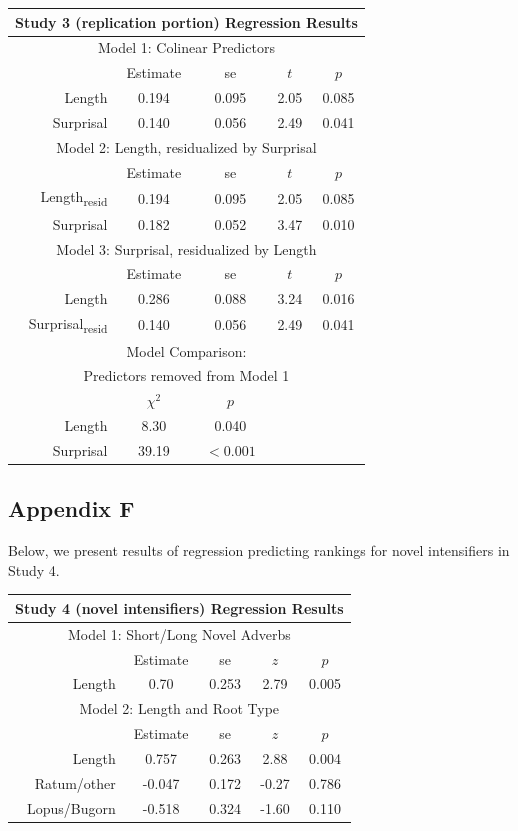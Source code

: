\noindent
\footnotesize{
\begin{tabular}{r|cccc}
\hline
\hline
\multicolumn{5}{c}{\textbf{Study 3 (replication portion) Regression Results}} \\
\hline
\hline
\multicolumn{5}{c}{Model 1: Colinear Predictors} \\
& Estimate & se & $t$ & $p$ \\
\hline
Length & 0.194 & 0.095 & 2.05 & 0.085 \\
Surprisal & 0.140 & 0.056 & 2.49 & 0.041 \\
\hline
\hline
\multicolumn{5}{c}{Model 2: Length, residualized by Surprisal} \\
& Estimate & se & $t$ & $p$ \\
\hline
Length\textsubscript{resid} & 0.194 & 0.095 & 2.05 & 0.085 \\
Surprisal & 0.182 & 0.052 & 3.47 & 0.010 \\
\hline
\hline
\multicolumn{5}{c}{Model 3: Surprisal, residualized by Length} \\
& Estimate & se & $t$ & $p$ \\
\hline
Length & 0.286 & 0.088 & 3.24 & 0.016 \\
Surprisal\textsubscript{resid} & 0.140 & 0.056 & 2.49 & 0.041 \\
\hline
\hline
\multicolumn{5}{c}{Model Comparison:} \\
\multicolumn{5}{c}{Predictors removed from Model 1} \\
& $\chi^2$ & $p$ \\
\hline
Length & 8.30 & 0.040 \\
Surprisal & 39.19 & $<0.001$ \\
\hline
\hline
\end{tabular}
}


\subsection{Appendix F}

Below, we present results of regression predicting rankings for novel intensifiers in Study 4.

\vspace{4mm}

\noindent
\footnotesize{
\begin{tabular}{r|cccc}
\hline
\hline
\multicolumn{5}{c}{\textbf{Study 4 (novel intensifiers) Regression Results}} \\
\hline
\hline
\multicolumn{5}{c}{Model 1: Short/Long Novel Adverbs} \\
& Estimate & se & $z$ & $p$ \\
\hline
Length & 0.70 & 0.253 & 2.79 & 0.005 \\
\hline
\hline
\multicolumn{5}{c}{Model 2: Length and Root Type} \\
& Estimate & se & $z$ & $p$ \\
\hline
Length       &  0.757 & 0.263 &  2.88 & 0.004 \\
Ratum/other  & -0.047 & 0.172 & -0.27 & 0.786 \\ 
Lopus/Bugorn & -0.518 & 0.324 & -1.60 & 0.110 \\
\hline
\hline
\end{tabular}
} 


